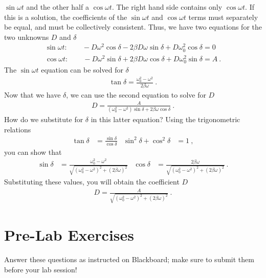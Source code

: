 \documentclass[12pt]{article}
\begin{document}
$\sin\omega t$ and the other half a $\cos\omega t$.  The right hand
side contains only $\cos\omega t$.  If this is a solution, the
coefficients of the $\sin\omega t$ and $\cos\omega t$ terms must
separately be equal, and must be collectively consistent.  Thus, we
have two equations for the two unknowns $D$ and $\delta$
\begin{gather*}
  \sin\omega t: \qquad -D\omega^2 \cos\delta - 2\beta D\omega
  \sin\delta + D\omega_0^2 \cos\delta = 0\\
  \cos\omega t: \qquad -D\omega^2 \sin\delta + 2\beta D\omega
  \cos\delta + D\omega_0^2 \sin\delta = A\ .
\end{gather*}
The $\sin\omega t$ equation can be solved for $\delta$
\begin{gather*}
  \tan\delta = \frac{\omega_0^2 - \omega^2}{2\beta\omega}\ .
\end{gather*}
Now that we have $\delta$, we can use the second equation to solve for
$D$
\begin{gather*}
  D = \frac{A}{\left(\omega_0^2-\omega^2\right) \sin\delta +
    2\beta\omega \cos\delta}\ .
\end{gather*}
How do we substitute for $\delta$ in this latter equation?  Using the
trigonometric relations
\begin{align*}
  \tan\delta &= \frac{\sin\delta}{\cos\delta} & 
  \sin^2\delta + \cos^2 \delta &= 1\ ,
\end{align*}
you can show that
\begin{align*}
  \sin\delta &= \frac{\omega_0^2 -
    \omega^2}{\sqrt{\left(\omega_0^2-\omega^2\right)^2 +
      \left(2\beta\omega\right)^2}} & 
  \cos\delta &=
  \frac{2\beta\omega}{\sqrt{\left(\omega_0^2-\omega^2\right)^2 + 
      \left(2\beta\omega\right)^2}}\ .
\end{align*}
Substituting these values, you will obtain the coefficient $D$
\begin{gather*}
  D = \frac{A}{\sqrt{\left(\omega_0^2-\omega^2\right)^2 + 
      \left(2\beta\omega\right)^2}}\ .
\end{gather*}


\newpage
 
\section*{Pre-Lab Exercises}

Answer these questions as instructed on Blackboard; make sure to
submit them before your lab session!
\end{document}
